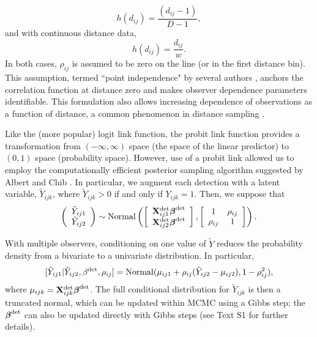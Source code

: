 \documentclass[10pt]{article}
\begin{document}
$$
h(d_{ij})=\frac{(d_{ij}-1)}{D-1},
$$
and with continuous distance data,
$$
h(d_{ij})=\frac{d_{ij}}{w}.
$$
In both cases, $\rho_{ij}$ is assumed to be zero on the line (or in the first distance bin).  This assumption, termed ``point independence" by several authors \cite{LaakeBorchers2004,BorchersEtAl2006,BucklandEtAl2010}, anchors the correlation function at distance zero and makes observer dependence parameters identifiable.  This formulation also allows increasing dependence of observations as a function of distance, a common phenomenon in distance sampling \cite{LaakeBorchers2004,BorchersEtAl2006,BucklandEtAl2010}.

Like the (more popular) logit link function, the probit link function provides a transformation from $(-\infty,\infty)$ space (the space of the linear predictor) to $(0,1)$ space (probability space).  However, use of a probit link allowed us to employ the computationally efficient posterior sampling algorithm suggested by Albert and Chib \cite{AlbertChib1993}.  In particular, we augment each detection with a latent variable, $\tilde{Y}_{ijk}$, where $\tilde{Y}_{ijk}>0$ if and only if $Y_{ijk}=1$.  Then,
we suppose that
\begin{equation} \label{eq:obs.mod}
\left(\begin{array}{c}
				\tilde{Y}_{ij1} \\
				\tilde{Y}_{ij2}
		\end{array}\right) \sim {\rm Normal}
\left( \left[ \begin{array}{c}
				{\bf X}_{ij1}^{\rm det} \boldsymbol{\beta}^{\rm det}\\
				{\bf X}_{ij2}^{\rm det} \boldsymbol{\beta}^{\rm det}
		\end{array}\right],
        \left[ \begin{array}{cc}
            1 & \rho_{ij} \\
            \rho_{ij} & 1
        \end{array} \right]
\right).
\end{equation}

With multiple observers, conditioning on one value of $\tilde{Y}$ reduces the probability density from a bivariate to a univariate distribution.  In particular,
\begin{equation}
\label{eq:biv_to_univ}
[\tilde{Y}_{ij1} | \tilde{Y}_{ij2},\beta^{\rm det},\rho_{ij}]={\rm Normal}(\mu_{ij1}+\rho_{ij}(\tilde{Y}_{ij2}-\mu_{ij2}),1-\rho_{ij}^2),
\end{equation}
where $\mu_{ijk}={\bf X}_{ijk}^{\rm det} \boldsymbol{\beta}^{\rm det}$.
The full conditional distribution for $\tilde{Y}_{ijk}$ is then a truncated normal, which can be updated within MCMC using a Gibbs step; the $\boldsymbol{\beta}^{\rm det}$ can also be updated directly with Gibbs steps (see Text S1 for further details).
\end{document}
